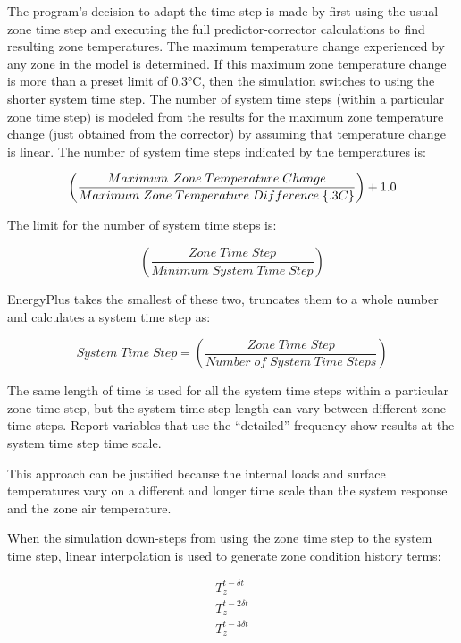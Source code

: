 The program's decision to adapt the time step is made by first using the usual zone time step and executing the full predictor-corrector calculations to find resulting zone temperatures. The maximum temperature change experienced by any zone in the model is determined. If this maximum zone temperature change is more than a preset limit of 0.3°C, then the simulation switches to using the shorter system time step. The number of system time steps (within a particular zone time step) is modeled from the results for the maximum zone temperature change (just obtained from the corrector) by assuming that temperature change is linear. The number of system time steps indicated by the temperatures is:

\begin{equation}
\left( {\frac{{Maximum{\kern 1pt} \;Zone\;Temperature\;Change}}{{Maximum\;Zone\;Temperature\;Difference\;\{ .3C\} }}} \right) + 1.0
\end{equation}

The limit for the number of system time steps is:

\begin{equation}
\left( {\frac{{Zone\;Time\;Step}}{{Minimum\;System\;Time\;Step}}} \right)
\end{equation}

EnergyPlus takes the smallest of these two, truncates them to a whole number and calculates a system time step as:

\begin{equation}
System\;Time\;Step = \left( {\frac{{Zone\;Time\;Step}}{{Number\;of\;System\;Time\;Steps}}} \right)
\end{equation}

The same length of time is used for all the system time steps within a particular zone time step, but the system time step length can vary between different zone time steps. Report variables that use the ``detailed'' frequency show results at the system time step time scale.

This approach can be justified because the internal loads and surface temperatures vary on a different and longer time scale than the system response and the zone air temperature.

When the simulation down-steps from using the zone time step to the system time step, linear interpolation is used to generate zone condition history terms:

\begin{equation}
\begin{array}{l}
  T_z^{t-\delta t} \\
  T_z^{t-2\delta t} \\
  T_z^{t-3\delta t}
\end{array}
\end{equation}

